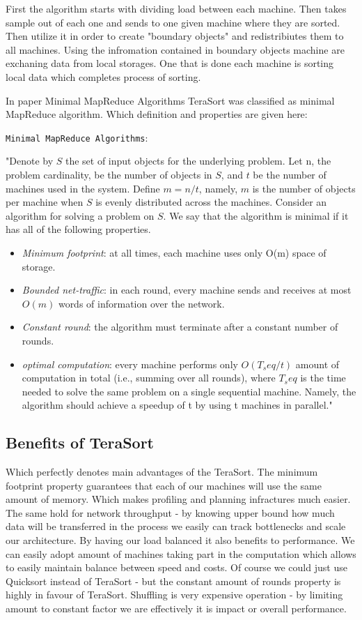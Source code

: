 First the algorithm starts with dividing load between each machine. Then takes sample 
out of each one and sends to one given machine where they are sorted.
Then utilize it in order to create "boundary objects" and redistribiutes them
to all machines. Using the infromation contained in boundary objects 
machine are exchaning data from local storages.
One that is done each machine is sorting local data which completes process of sorting.

In paper Minimal MapReduce Algorithms TeraSort was classified as
minimal MapReduce algorithm. Which definition and properties are given
here:


\texttt{Minimal MapReduce Algorithms}\citep{minimalmapreduce}:

"Denote by $S$ the set of input objects 
for the underlying problem. Let n, the problem cardinality,
be the number of objects in $S$, and $t$ be the number of machines
used in the system. Define $m = n/t$, namely, $m$ is the number
of objects per machine when $S$ is evenly distributed across the
machines. Consider an algorithm for solving a problem on $S$.
We say that the algorithm is minimal if it has all of the following
properties.

\begin{itemize}
\item \emph{Minimum footprint}: at all times, each machine uses only
O(m) space of storage.
\item \emph{Bounded net-traffic}: in each round, every machine sends
and receives at most $O(m)$ words of information over the
network.
\item  \emph{Constant round}: the algorithm must terminate after a
constant number of rounds.
\item \emph{optimal computation}: every machine performs only
$O(T_seq /t)$ amount of computation in total (i.e., summing
over all rounds), where $T_seq$ is the time needed to solve the
same problem on a single sequential machine. Namely, the
algorithm should achieve a speedup of t by using t machines
in parallel." 
\end{itemize}


\subsection{Benefits of TeraSort}
Which perfectly denotes main advantages of the TeraSort. The minimum footprint property guarantees
that each of our machines will use the same amount of memory. Which makes profiling
and planning infractures much easier. The same hold for network throughput - by knowing
upper bound how much data will be transferred in the process we easily can track bottlenecks
and scale our architecture.
By having our load balanced it also benefits to performance. We can easily adopt amount of machines
taking part in the computation which allows to easily maintain balance between speed and costs.
Of course we could just use Quicksort instead of TeraSort - but the constant amount of rounds property
is highly in favour of TeraSort. Shuffling is very expensive operation - by limiting amount to constant
factor we are effectively it is impact or overall performance.
